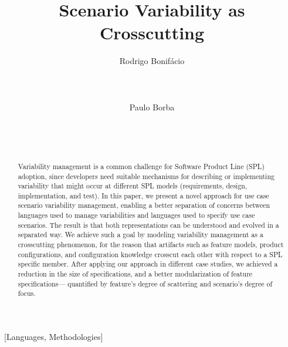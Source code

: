 \documentclass{acm_proc_article-sp}
\begin{document}
\lstset{language=Haskell, numbers=left,
numberstyle=\tiny,numbersep=5pt,basicstyle=\scriptsize,aboveskip=20pt}

\title{Scenario Variability as Crosscutting}



\author{
\alignauthor
Rodrigo Bonif\'{a}cio\\
       \\
       \\
       \\
\alignauthor
Paulo Borba\\
       \\
       \\
       \\
}

\maketitle              

\begin{abstract}
Variability management is a common challenge for Software Product
Line (SPL) adoption, since developers need suitable
mechanisms for describing or implementing variability
that might occur at different SPL models (requirements, design,
implementation, and test). In this paper, we present a novel approach for
use case scenario variability management, enabling a better
separation of concerns between languages used to manage
variabilities and languages used to specify use case scenarios. The
result is that both representations can be understood and evolved in
a separated way. We achieve such a goal by modeling variability management
as a crosscutting phenomenon, for the reason that artifacts such as feature models, 
product configurations, and configuration knowledge crosscut each 
other with respect to a SPL specific member. After applying our approach in
different case studies, we achieved a reduction in the size of specifications,
and a better modularization of feature specifications--- quantified
by feature's degree of scattering and scenario's degree of focus.
\end{abstract}

[Languages,
Methodologies]\
\end{document}
